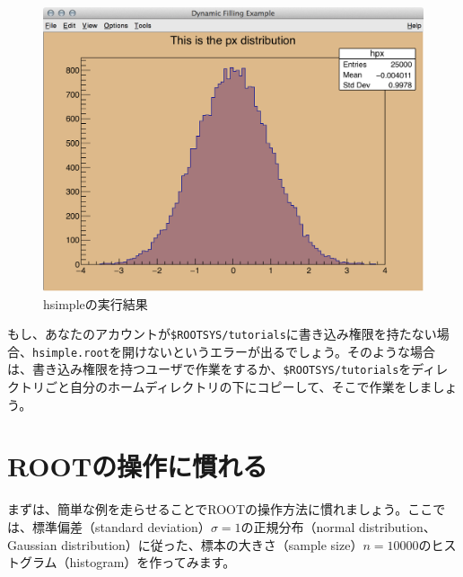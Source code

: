 \begin{figure}
  \centering
  \includegraphics[width=12cm]{fig/hsimple.png}
  \caption{hsimpleの実行結果}
  \label{fig:hsimple}
\end{figure}

もし、あなたのアカウントが\texttt{\$ROOTSYS/tutorials}に書き込み権限を持たない場合、\texttt{hsimple.root}を開けないというエラーが出るでしょう。そのような場合は、書き込み権限を持つユーザで作業をするか、\texttt{\$ROOTSYS/tutorials}をディレクトリごと自分のホームディレクトリの下にコピーして、そこで作業をしましょう。

\section{ROOTの操作に慣れる}

まずは、簡単な例を走らせることでROOTの操作方法に慣れましょう。ここでは、標準偏差（standard deviation）$\sigma=1$の正規分布（normal distribution、Gaussian distribution）に従った、標本の大きさ（sample size）$n=10000$のヒストグラム（histogram）を作ってみます。

